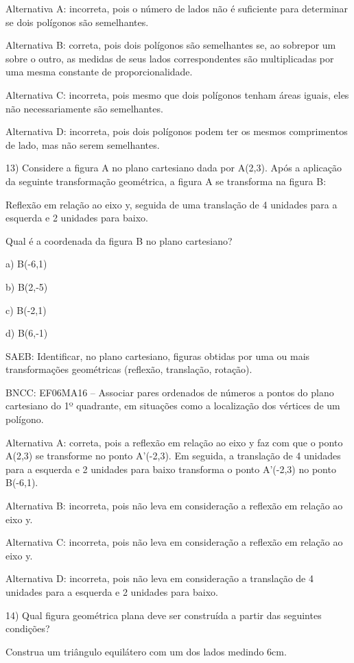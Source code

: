 Alternativa A: incorreta, pois o número de lados não é suficiente para
determinar se dois polígonos são semelhantes.

Alternativa B: correta, pois dois polígonos são semelhantes se, ao
sobrepor um sobre o outro, as medidas de seus lados correspondentes são
multiplicadas por uma mesma constante de proporcionalidade.

Alternativa C: incorreta, pois mesmo que dois polígonos tenham áreas
iguais, eles não necessariamente são semelhantes.

Alternativa D: incorreta, pois dois polígonos podem ter os mesmos
comprimentos de lado, mas não serem semelhantes.

13) Considere a figura A no plano cartesiano dada por A(2,3). Após a
aplicação da seguinte transformação geométrica, a figura A se transforma
na figura B:

Reflexão em relação ao eixo y, seguida de uma translação de 4 unidades
para a esquerda e 2 unidades para baixo.

Qual é a coordenada da figura B no plano cartesiano?

a) B(-6,1)

b) B(2,-5)

c) B(-2,1)

d) B(6,-1)

SAEB: Identificar, no plano cartesiano, figuras obtidas por uma ou mais
transformações geométricas (reflexão, translação, rotação).

BNCC: EF06MA16 -- Associar pares ordenados de números a pontos do plano
cartesiano do 1º quadrante, em situações como a localização dos vértices
de um polígono.

Alternativa A: correta, pois a reflexão em relação ao eixo y faz com que
o ponto A(2,3) se transforme no ponto A'(-2,3). Em seguida, a translação
de 4 unidades para a esquerda e 2 unidades para baixo transforma o ponto
A'(-2,3) no ponto B(-6,1).

Alternativa B: incorreta, pois não leva em consideração a reflexão em
relação ao eixo y.

Alternativa C: incorreta, pois não leva em consideração a reflexão em
relação ao eixo y.

Alternativa D: incorreta, pois não leva em consideração a translação de
4 unidades para a esquerda e 2 unidades para baixo.

14) Qual figura geométrica plana deve ser construída a partir das
seguintes condições?

Construa um triângulo equilátero com um dos lados medindo 6cm.

